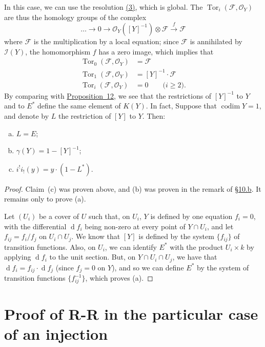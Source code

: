 \documentclass{article}
\theoremstyle{plain}
\newenvironment{proposition}[1]
    {\renewcommand\theinnerproposition{#1}\innerproposition}
    {\endinnerproposition}
\theoremstyle{definition}
\newcommand{\scr}[1]{{\mathscr{#1}}}
\newcommand{\dd}{\operatorname{d}\!}
\renewcommand{\geq}{\geqslant}
\DeclareMathOperator{\Tor}{Tor}
\DeclareMathOperator{\codim}{codim}
\newcommand{\oldpage}[1]{\marginpar{\footnotesize$\Big\vert$ \textit{p.~#1}}}
\begin{document}
In this case, we can use the resolution \hyperref[equation3]{(3)}, which is global.
The $\Tor_i(\scr{F},\scr{O}_Y)$ are thus the homology groups of the complex
\[
  \ldots \to 0 \to \scr{O}_Y([Y]^{-1})\otimes\scr{F} \xrightarrow{f}\scr{F}
\]
where $\scr{F}$ is the multiplication by a local equation;
since $\scr{F}$ is annihilated by $\scr{I}(Y)$, the homomorphism $f$ has a zero image, which implies that
\begin{align*}
  \Tor_0(\scr{F},\scr{O}_Y) &= \scr{F}
\\\Tor_1(\scr{F},\scr{O}_Y) &= [Y]^{-1}\cdot\scr{F}
\\\Tor_i(\scr{F},\scr{O}_Y) &= 0 \qquad\mbox{($i\geq2$).}
\end{align*}
By comparing with \hyperref[proposition12]{Proposition~12}, we see that the restrictions of $[Y]^{-1}$ to $Y$ and to $E^*$ define the same element of $K(Y)$.
In fact,
\begin{proposition}{13}
\label{proposition13}
  Suppose that $\codim Y=1$, and denote by $L$ the restriction of $[Y]$ to $Y$.
  Then:
  \begin{enumerate}[(a)]
    \item $L=E$;
    \item $\gamma(Y) = 1-[Y]^{-1}$;
    \item $i^!i_!(y) = y\cdot(1-L^*).$
  \end{enumerate}
\end{proposition}

\begin{proof}
\oldpage{124}
  Claim~(c) was proven above, and (b) was proven in the remark of \hyperref[subsection10b]{\S10.b}.
  It remains only to prove (a).

  Let $(U_i)$ be a cover of $U$ such that, on $U_i$, $Y$ is defined by one equation $f_i=0$, with the differential $\dd f_i$ being non-zero at every point of $Y\cap U_i$, and let $f_{ij}=f_i/f_j$ on $U_i\cap U_j$.
  We know that $[Y]$ is defined by the system $\{f_{ij}\}$ of transition functions.
  Also, on $U_i$, we can identify $E^*$ with the product $U_i\times k$ by applying $\dd f_i$ to the unit section.
  But, on $Y\cap U_i\cap U_j$, we have that $\dd f_i=f_{ij}\cdot\dd f_j$ (since $f_j=0$ on $Y$), and so we can define $E^*$ by the system of transition functions $\{f_{ij}^{-1}\}$, which proves (a).
\end{proof}


\section{Proof of R-R in the particular case of an injection}
\label{section11}
\end{document}
